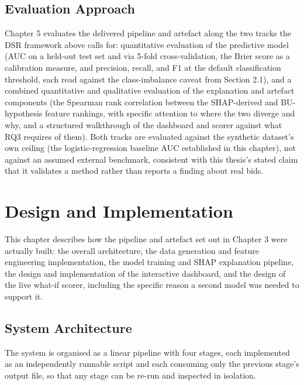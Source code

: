 \documentclass[12pt,oneside]{report}
\begin{document}
\hypertarget{evaluation-approach}{%
\section{Evaluation Approach}\label{evaluation-approach}}

Chapter 5 evaluates the delivered pipeline and artefact along the two
tracks the DSR framework above calls for: quantitative evaluation of the
predictive model (AUC on a held-out test set and via 5-fold
cross-validation, the Brier score as a calibration measure, and
precision, recall, and F1 at the default classification threshold, each
read against the class-imbalance caveat from Section 2.1), and a
combined quantitative and qualitative evaluation of the explanation and
artefact components (the Spearman rank correlation between the
SHAP-derived and BU-hypothesis feature rankings, with specific attention
to where the two diverge and why, and a structured walkthrough of the
dashboard and scorer against what RQ3 requires of them). Both tracks are
evaluated against the synthetic dataset's own ceiling (the
logistic-regression baseline AUC established in this chapter), not
against an assumed external benchmark, consistent with this thesis's
stated claim that it validates a method rather than reports a finding
about real bids.

\hypertarget{design-and-implementation}{%
\chapter{Design and Implementation}\label{design-and-implementation}}

This chapter describes how the pipeline and artefact set out in Chapter
3 were actually built: the overall architecture, the data generation and
feature engineering implementation, the model training and SHAP
explanation pipeline, the design and implementation of the interactive
dashboard, and the design of the live what-if scorer, including the
specific reason a second model was needed to support it.

\hypertarget{system-architecture}{%
\section{System Architecture}\label{system-architecture}}

The system is organised as a linear pipeline with four stages, each
implemented as an independently runnable script and each consuming only
the previous stage's output file, so that any stage can be re-run and
inspected in isolation.
\end{document}
